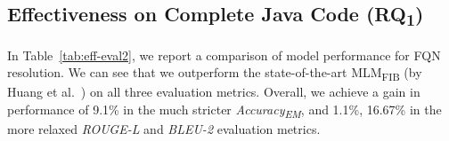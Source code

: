 \subsection{Effectiveness on Complete Java Code (RQ\textsubscript{1})}
\label{sec:rq1}

In Table~\ref{tab:eff-eval2}, we report a comparison of model performance for FQN resolution. We can see that we outperform the state-of-the-art MLM\textsubscript{FIB} (by Huang et al.~\cite{prompt-ase22}) on all three evaluation metrics. Overall, we achieve a gain in performance of 9.1\% in the much stricter \textit{Accuracy\textsubscript{EM}}, and 1.1\%, 16.67\% in the more relaxed \textit{ROUGE-L} and \textit{BLEU-2} evaluation metrics.


